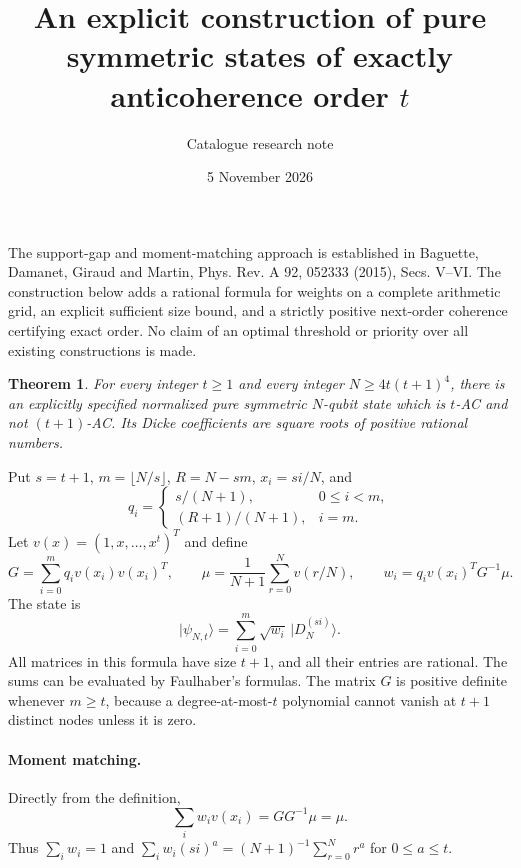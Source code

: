 \documentclass[11pt]{article}
\title{An explicit construction of pure symmetric states of exactly anticoherence order $t$}
\author{Catalogue research note}
\date{5 November 2026}
\newtheorem{theorem}{Theorem}
\newcommand{\D}[2]{\lvert D_{#1}^{(#2)}\rangle}
\begin{document}
\maketitle
The support-gap and moment-matching approach is established in Baguette, Damanet, Giraud and Martin, Phys. Rev. A 92, 052333 (2015), Secs. V--VI. The construction below adds a rational formula for weights on a complete arithmetic grid, an explicit sufficient size bound, and a strictly positive next-order coherence certifying exact order. No claim of an optimal threshold or priority over all existing constructions is made.
\begin{theorem}
For every integer $t\ge1$ and every integer $N\ge4t(t+1)^4$, there is an explicitly specified normalized pure symmetric $N$-qubit state which is $t$-AC and not $(t+1)$-AC. Its Dicke coefficients are square roots of positive rational numbers.
\end{theorem}
Put $s=t+1$, $m=\lfloor N/s\rfloor$, $R=N-sm$, $x_i=si/N$, and
\[
q_i=\begin{cases}s/(N+1),&0\le i<m,\\(R+1)/(N+1),&i=m.\end{cases}
\]
Let $v(x)=(1,x,\ldots,x^t)^T$ and define
\[
G=\sum_{i=0}^m q_i v(x_i)v(x_i)^T,\qquad
\mu=\frac1{N+1}\sum_{r=0}^N v(r/N),\qquad
w_i=q_i v(x_i)^TG^{-1}\mu.
\]
The state is
\[
\lvert\psi_{N,t}\rangle=\sum_{i=0}^m\sqrt{w_i}\,\D{N}{si}.
\]
All matrices in this formula have size $t+1$, and all their entries are rational. The sums can be evaluated by Faulhaber's formulas. The matrix $G$ is positive definite whenever $m\ge t$, because a degree-at-most-$t$ polynomial cannot vanish at $t+1$ distinct nodes unless it is zero.

\paragraph{Moment matching.}
Directly from the definition,
\[
\sum_i w_i v(x_i)=GG^{-1}\mu=\mu.
\]
Thus $\sum_iw_i=1$ and $\sum_iw_i(si)^a=(N+1)^{-1}\sum_{r=0}^Nr^a$ for $0\le a\le t$.
\end{document}
